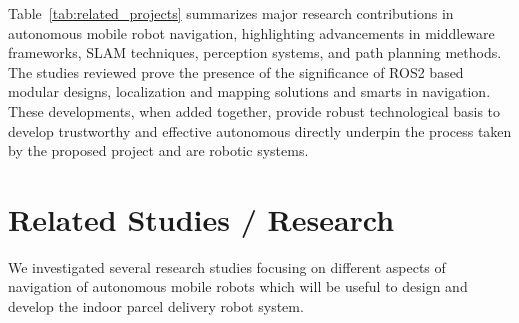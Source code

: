 Table~\ref{tab:related_projects} summarizes major research contributions in autonomous mobile robot navigation, highlighting advancements in middleware frameworks, SLAM techniques, perception systems, and path planning methods. The studies reviewed prove the presence of the significance of ROS2 based modular designs, localization and mapping solutions and smarts in navigation. These developments, when added together, provide robust technological basis to develop trustworthy and effective autonomous directly underpin the process taken by the proposed project and are robotic systems.

\section{Related Studies / Research}

We investigated several research studies focusing on different aspects of navigation of autonomous mobile robots which will be useful to design and develop the indoor parcel delivery robot system.

